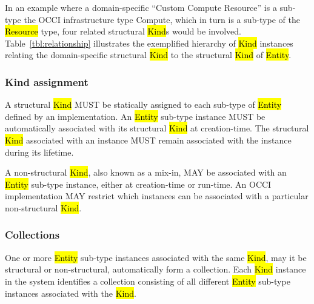 \documentclass[10pt,a4paper,british]{article}
\begin{document}
In an example where a domain-specific ``Custom Compute Resource'' is a sub-type
the OCCI infrastructure type Compute, which in turn is a sub-type of the
\hl{Resource} type, four related structural \hl{Kind}s would be involved.
%
Table~\ref{tbl:relationship} illustrates the exemplified hierarchy of \hl{Kind}
instances relating the domain-specific structural \hl{Kind} to the structural
\hl{Kind} of \hl{Entity}.


\subsubsection{Kind assignment}
\label{sec:type_assignment}
A structural \hl{Kind} MUST be statically assigned to each sub-type of
\hl{Entity} defined by an implementation. An \hl{Entity} sub-type instance MUST be
automatically associated with its structural \hl{Kind} at creation-time.  The
structural \hl{Kind} associated with an instance MUST remain associated with the
instance during its lifetime.

A non-structural \hl{Kind}, also known as a mix-in, MAY be associated with an
\hl{Entity} sub-type instance, either at creation-time or run-time. An OCCI
implementation MAY restrict which instances can be associated with a particular
non-structural \hl{Kind}.

\subsubsection{Collections}
\label{sec:collection}
One or more \hl{Entity} sub-type instances associated with the same \hl{Kind},
may it be structural or non-structural, automatically form a collection.
Each \hl{Kind} instance in the system identifies a collection consisting of all
different \hl{Entity} sub-type instances associated with the \hl{Kind}.
\end{document}
